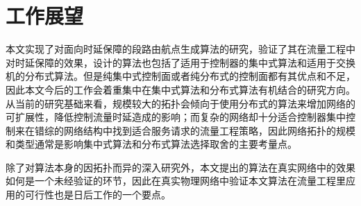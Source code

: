 \section{工作展望}

本文实现了对面向时延保障的段路由航点生成算法的研究，验证了其在流量工程中对时延保障的效果，设计的算法也包括了适用于控制器的集中式算法和适用于交换机的分布式算法。但是纯集中式控制面或者纯分布式的控制面都有其优点和不足，因此本文今后的工作会着重集中在集中式算法和分布式算法有机结合的研究方向。从当前的研究基础来看，规模较大的拓扑会倾向于使用分布式的算法来增加网络的可扩展性，降低控制流量时延造成的影响；而复杂的网络却十分适合控制器集中控制来在错综的网络结构中找到适合服务请求的流量工程策略，因此网络拓扑的规模和类型通常是影响集中式算法和分布式算法选择取舍的主要考量点。

除了对算法本身的因拓扑而异的深入研究外，本文提出的算法在真实网络中的效果如何是一个未经验证的环节，因此在真实物理网络中验证本文算法在流量工程里应用的可行性也是日后工作的一个要点。



\ifx\usechapbib\empty
\nocite{BSTcontrol}
\setcounter{NAT@ctr}{0}


\fi

